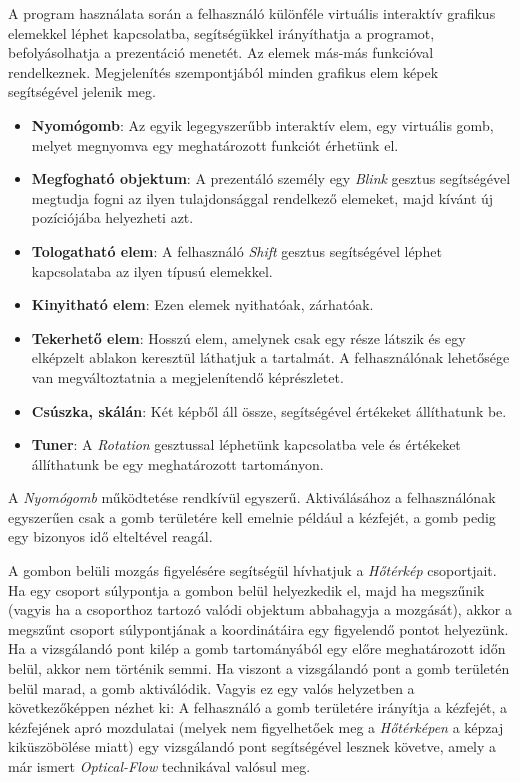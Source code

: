 

A program használata során a felhasználó különféle virtuális interaktív grafikus elemekkel léphet kapcsolatba, segítségükkel irányíthatja a programot, befolyásolhatja a prezentáció menetét. Az elemek más-más funkcióval rendelkeznek. Megjelenítés szempontjából minden grafikus elem képek segítségével jelenik meg.

\begin{itemize}
	\item \textbf{Nyomógomb}: Az egyik legegyszerűbb interaktív elem, egy virtuális gomb, melyet megnyomva egy meghatározott funkciót érhetünk el.
	\item \textbf{Megfogható objektum}: A prezentáló személy egy \textit{Blink} gesztus segítségével megtudja fogni az ilyen tulajdonsággal rendelkező elemeket, majd kívánt új pozíciójába helyezheti azt.
	\item \textbf{Tologatható elem}: A felhasználó \textit{Shift} gesztus segítségével léphet kapcsolataba az ilyen típusú elemekkel.
	\item \textbf{Kinyitható elem}: Ezen elemek nyithatóak, zárhatóak.
	\item \textbf{Tekerhető elem}: Hosszú elem, amelynek csak egy része látszik és egy elképzelt ablakon keresztül láthatjuk a tartalmát. A felhasználónak lehetősége van megváltoztatnia a megjelenítendő képrészletet.
	\item \textbf{Csúszka, skálán}: Két képből áll össze, segítségével értékeket állíthatunk be.
	\item \textbf{Tuner}: A \textit{Rotation} gesztussal léphetünk kapcsolatba vele és értékeket állíthatunk be egy meghatározott tartományon.
\end{itemize} 


A \textit{Nyomógomb} működtetése rendkívül egyszerű. Aktiválásához a felhasználónak egyszerűen csak a gomb területére kell emelnie például a kézfejét, a gomb pedig egy bizonyos idő elteltével reagál.

A gombon belüli mozgás figyelésére segítségül hívhatjuk a \textit{Hőtérkép} csoportjait. Ha egy csoport súlypontja a gombon belül helyezkedik el, majd ha megszűnik (vagyis ha a csoporthoz tartozó valódi objektum abbahagyja a mozgását), akkor a megszűnt csoport súlypontjának a koordinátáira egy figyelendő pontot helyezünk. Ha a vizsgálandó pont kilép a gomb tartományából egy előre meghatározott időn belül, akkor nem történik semmi. Ha viszont a vizsgálandó pont a gomb területén belül marad, a gomb aktiválódik. 
Vagyis ez egy valós helyzetben a következőképpen nézhet ki: A felhasználó a gomb területére irányítja a kézfejét, a kézfejének apró mozdulatai (melyek nem figyelhetőek meg a \textit{Hőtérképen} a képzaj kiküszöbölése miatt) egy vizsgálandó pont segítségével lesznek követve, amely a már ismert \textit{Optical-Flow} technikával valósul meg.

